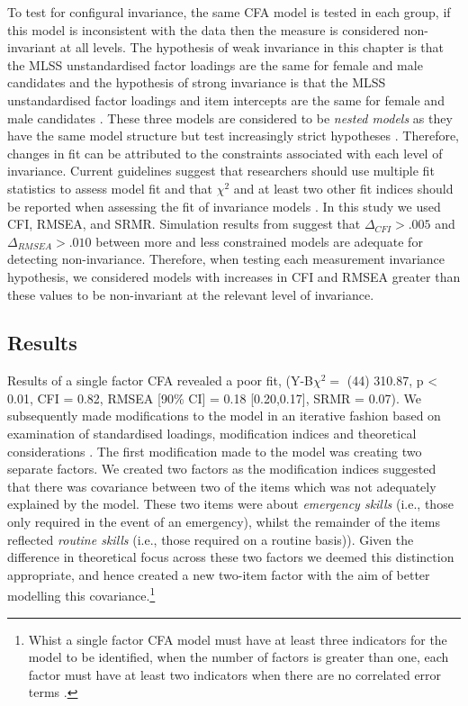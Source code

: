 \documentclass[
  12pt,
  a4paper,
]{book}
\begin{document}
To test for configural invariance, the same CFA model is tested in each group, if this model is inconsistent with the data then the measure is considered non-invariant at all levels. The hypothesis of weak invariance in this chapter is that the MLSS unstandardised factor loadings are the same for female and male candidates and the hypothesis of strong invariance is that the MLSS unstandardised factor loadings and item intercepts are the same for female and male candidates \citep[cf.~][]{Kline2016}. These three models are considered to be \emph{nested models} as they have the same model structure but test increasingly strict hypotheses \citep{Kline2016}. Therefore, changes in fit can be attributed to the constraints associated with each level of invariance. Current guidelines suggest that researchers should use multiple fit statistics to assess model fit \citep{Kline2016} and that \(\chi^2\) and at least two other fit indices should be reported when assessing the fit of invariance models \citep{Putnick2016}. In this study we used CFI, RMSEA, and SRMR. Simulation results from \citet{Chen2007} suggest that \(\Delta_{CFI} > .005\) and \(\Delta_{RMSEA} > .010\) between more and less constrained models are adequate for detecting non-invariance. Therefore, when testing each measurement invariance hypothesis, we considered models with increases in CFI and RMSEA greater than these values to be non-invariant at the relevant level of invariance.

\hypertarget{study-5-results}{%
\subsection{Results}\label{study-5-results}}

Results of a single factor CFA revealed a poor fit, (Y-B\(\chi^2 =\) (44) 310.87, p \textless{} 0.01, CFI = 0.82, RMSEA {[}90\% CI{]} = 0.18 {[}0.20,0.17{]}, SRMR = 0.07). We subsequently made modifications to the model in an iterative fashion based on examination of standardised loadings, modification indices and theoretical considerations \citep[cf.~][]{Biddle2001}. The first modification made to the model was creating two separate factors. We created two factors as the modification indices suggested that there was covariance between two of the items which was not adequately explained by the model. These two items were about \emph{emergency skills} (i.e., those only required in the event of an emergency), whilst the remainder of the items reflected \emph{routine skills} (i.e., those required on a routine basis)). Given the difference in theoretical focus across these two factors we deemed this distinction appropriate, and hence created a new two-item factor with the aim of better modelling this covariance.\footnote{Whist a single factor CFA model must have at least three indicators for the model to be identified, when the number of factors is greater than one, each factor must have at least two indicators when there are no correlated error terms \citep{Kline2016}.}
\end{document}
